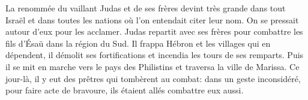 La renommée du vaillant Judas et de ses frères devint très grande dans tout Israël
	et dans toutes les nations où l’on entendait citer leur nom.
	On se pressait autour d’eux pour les acclamer.
Judas repartit avec ses frères pour combattre les fils d’Ésaü dans la région du Sud.
	Il frappa Hébron et les villages qui en dépendent,
	il démolit ses fortifications et incendia les tours de ses remparts.
Puis il se mit en marche vers le pays des Philistins et traversa la ville de Marissa.
Ce jour-là, il y eut des prêtres qui tombèrent au combat:
	dans un geste inconsidéré, pour faire acte de bravoure,
	ils étaient allés combattre eux aussi.
